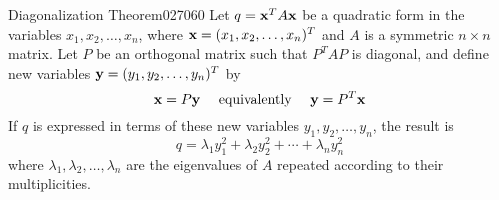 \begin{theorem}{Diagonalization Theorem}{027060}
Let $q = \textbf{x}^{T}A\textbf{x}$ be a quadratic form in the variables $x_{1}, x_{2}, \dots, x_{n}$, where $\textbf{x} = (x_{1}, x_{2}, \dots, x_{n})^{T}$ and $A$ is a symmetric $n \times n$ matrix. Let $P$ be an orthogonal matrix such that $P^{T}AP$ is diagonal, and define new variables $\textbf{y} = (y_{1}, y_{2}, \dots, y_{n})^{T}$ by
\begin{equation*}
\textbf{x} = P\textbf{y} \quad \mbox{ equivalently } \quad \textbf{y} = P^T\textbf{x}
\end{equation*}
If $q$ is expressed in terms of these new variables $y_{1}, y_{2}, \dots, y_{n}$, the result is
\begin{equation*}
q = \lambda_{1}y_{1}^2 + \lambda_{2}y_{2}^2 + \cdots + \lambda_{n}y_{n}^2
\end{equation*}
where $\lambda_{1}, \lambda_{2}, \dots, \lambda_{n}$ are the eigenvalues of $A$ repeated according to their multiplicities.
\end{theorem}

